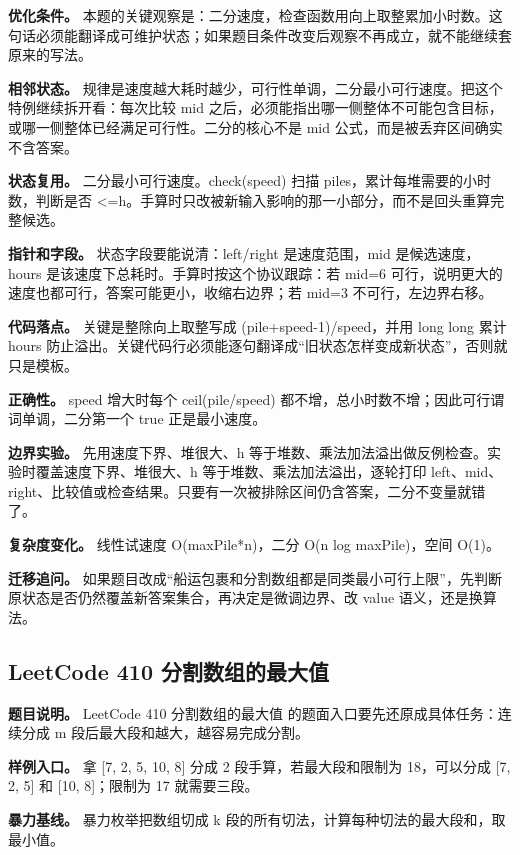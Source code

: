 \textbf{优化条件。} 本题的关键观察是：二分速度，检查函数用向上取整累加小时数。这句话必须能翻译成可维护状态；如果题目条件改变后观察不再成立，就不能继续套原来的写法。

\textbf{相邻状态。} 规律是速度越大耗时越少，可行性单调，二分最小可行速度。把这个特例继续拆开看：每次比较 mid 之后，必须能指出哪一侧整体不可能包含目标，或哪一侧整体已经满足可行性。二分的核心不是 mid 公式，而是被丢弃区间确实不含答案。

\textbf{状态复用。} 二分最小可行速度。check(speed) 扫描 piles，累计每堆需要的小时数，判断是否 <=h。手算时只改被新输入影响的那一小部分，而不是回头重算完整候选。

\textbf{指针和字段。} 状态字段要能说清：left/right 是速度范围，mid 是候选速度，hours 是该速度下总耗时。手算时按这个协议跟踪：若 mid=6 可行，说明更大的速度也都可行，答案可能更小，收缩右边界；若 mid=3 不可行，左边界右移。

\textbf{代码落点。} 关键是整除向上取整写成 (pile+speed-1)/speed，并用 long long 累计 hours 防止溢出。关键代码行必须能逐句翻译成“旧状态怎样变成新状态”，否则就只是模板。

\textbf{正确性。} speed 增大时每个 ceil(pile/speed) 都不增，总小时数不增；因此可行谓词单调，二分第一个 true 正是最小速度。

\textbf{边界实验。} 先用速度下界、堆很大、h 等于堆数、乘法加法溢出做反例检查。实验时覆盖速度下界、堆很大、h 等于堆数、乘法加法溢出，逐轮打印 left、mid、right、比较值或检查结果。只要有一次被排除区间仍含答案，二分不变量就错了。

\textbf{复杂度变化。} 线性试速度 O(maxPile*n)，二分 O(n log maxPile)，空间 O(1)。

\textbf{迁移追问。} 如果题目改成“船运包裹和分割数组都是同类最小可行上限”，先判断原状态是否仍然覆盖新答案集合，再决定是微调边界、改 value 语义，还是换算法。

\subsection{LeetCode 410 分割数组的最大值}

\textbf{题目说明。} LeetCode 410 分割数组的最大值 的题面入口要先还原成具体任务：连续分成 m 段后最大段和越大，越容易完成分割。

\textbf{样例入口。} 拿 [7, 2, 5, 10, 8] 分成 2 段手算，若最大段和限制为 18，可以分成 [7, 2, 5] 和 [10, 8]；限制为 17 就需要三段。

\textbf{暴力基线。} 暴力枚举把数组切成 k 段的所有切法，计算每种切法的最大段和，取最小值。

